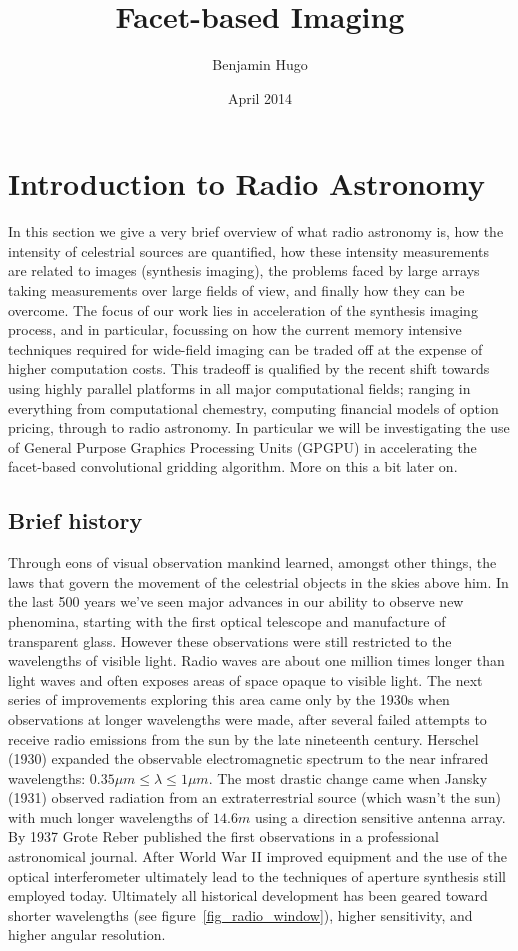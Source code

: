 \documentclass[a4paper,10pt]{report}
\title{Facet-based Imaging}
\author{Benjamin Hugo}
\date{April 2014}
\begin{document}
\maketitle
\chapter{Introduction to Radio Astronomy}
In this section we give a very brief overview of what radio astronomy is, how the intensity of celestrial sources are quantified, how these intensity measurements are related to images (synthesis imaging),
the problems faced by large arrays taking measurements over large fields of view, and finally how they can be overcome. The focus of our work lies in acceleration of the synthesis imaging process, and in particular,
focussing on how the current memory intensive techniques required for wide-field imaging can be traded off at the expense of higher computation costs. This tradeoff is qualified by the recent shift towards using 
highly parallel platforms in all major computational fields; ranging in everything from computational chemestry, computing financial models of option pricing, through to radio astronomy. In particular we will be investigating 
the use of General Purpose Graphics Processing Units (GPGPU) in accelerating the facet-based convolutional gridding algorithm. More on this a bit later on.

\section{Brief history}
Through eons of visual observation mankind learned, amongst other things, the laws that govern the movement of the celestrial objects in the skies above him. In the last 500 years we've 
seen major advances in our ability to observe new phenomina, starting with the first optical telescope and manufacture of transparent glass. However these observations
were still restricted to the wavelengths of visible light. Radio waves are about one million times longer than light waves and often exposes areas of space opaque to visible light. The 
next series of improvements exploring this area came only by the 1930s when observations at longer wavelengths were made, after several failed attempts to receive radio emissions from the sun by the 
late nineteenth century. Herschel (1930) expanded the observable electromagnetic spectrum to the near infrared wavelengths: $0.35\mu m \leq\lambda\leq 1\mu m$. The most drastic change came when Jansky (1931) 
observed radiation from an extraterrestrial source (which wasn't the sun) with much longer wavelengths of $14.6m$ using a direction sensitive antenna array. By 1937 Grote Reber published the first observations 
in a professional astronomical journal. After World War II improved equipment and the use of the optical interferometer ultimately lead to the techniques of aperture synthesis still employed today. Ultimately all
historical development has been geared toward shorter wavelengths (see figure~\ref{fig_radio_window}), higher sensitivity, and higher angular resolution\cite{christiansenradiotelescopes,wilson2009tools}.
\end{document}
